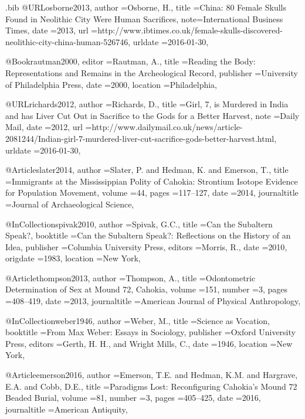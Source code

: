 \begin{filecontents}{\IJSRAidentifier.bib}
@URL{osborne2013,
	author   ={Osborne, H.},
	title    ={China: 80 Female Skulls Found in Neolithic City Were Human Sacrifices},
	note={International Business Times},
	date     ={2013},
	url      ={http://www.ibtimes.co.uk/female-skulls-discovered-neolithic-city-china-human-526746},
	urldate  ={2016-01-30},
}

@Book{rautman2000,
	editor       ={Rautman, A.},
	title        ={Reading the Body: Representations and Remains in the Archeological Record},
	publisher    ={University of Philadelphia Press},
	date         ={2000},
	location     ={Philadelphia},
}

@URL{richards2012,
	author    ={Richards, D.},
	title     ={Girl, 7, is Murdered in India and has Liver Cut Out in Sacrifice to the Gods for a Better Harvest},
	note ={Daily Mail},
	date      ={2012},
	url       ={http://www.dailymail.co.uk/news/article-2081244/Indian-girl-7-murdered-liver-cut-sacrifice-gods-better-harvest.html},
	urldate   ={2016-01-30},
	}

@Article{slater2014,
	author       ={Slater, P. and Hedman, K. and Emerson, T.},
	title        ={Immigrants at the Mississippian Polity of Cahokia: Strontium Isotope Evidence for Population Movement},
	volume       ={44},
	pages        ={117--127},
	date         ={2014},
	journaltitle ={Journal of Archaeological Science},
}

@InCollection{spivak2010,
	author       ={Spivak, G.C.},
	title        ={Can the Subaltern Speak?},
	booktitle    ={Can the Subaltern Speak?: Reflections on the History of an Idea},
	publisher    ={Columbia University Press},
	editors      ={Morris, R.},
	date         ={2010},
	origdate     ={1983},
	location     ={New York},
}

@Article{thompson2013,
	author       ={Thompson, A.},
	title        ={Odontometric Determination of Sex at Mound 72, Cahokia},
	volume       ={151},
	number       ={3},
	pages        ={408--419},
	date         ={2013},
	journaltitle ={American Journal of Physical Anthropology},
}

@InCollection{weber1946,
	author       ={Weber, M.},
	title        ={Science as Vocation},
	booktitle    ={From Max Weber: Essays in Sociology},
	publisher    ={Oxford University Press},
	editors      ={Gerth, H. H., and Wright Mills, C.},
	date         ={1946},
	location     ={New York},
}


@Article{emerson2016,
	author       ={Emerson, T.E. and Hedman, K.M. and Hargrave, E.A. and Cobb, D.E.},
	title        ={Paradigms Lost: Reconfiguring Cahokia's Mound 72 Beaded Burial},
	volume       ={81},
	number       ={3},
	pages        ={405--425},
	date         ={2016},
	journaltitle ={American Antiquity},
}


\end{filecontents}
